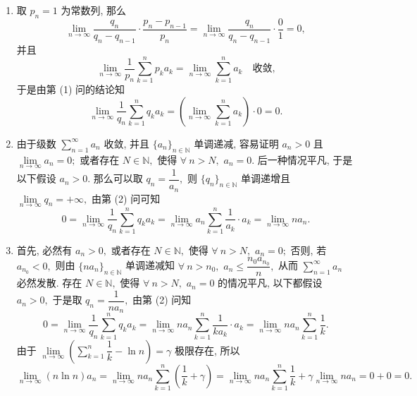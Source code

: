 \begin{solution}
\begin{enumerate}
\item 取 $p_n = 1$ 为常数列, 那么
$$\lim\limits_{n\to\infty} \dfrac{q_n}{q_n - q_{n-1}} \cdot \dfrac{p_n - p_{n-1}}{p_n} = \lim\limits_{n\to\infty} \dfrac{q_n}{q_n - q_{n-1}} \cdot \dfrac{0}{1} = 0,$$
并且
$$\lim\limits_{n \to \infty} \dfrac{1}{p_n} \sum\limits_{k=1}^n p_ka_k = \lim\limits_{n \to \infty} \sum\limits_{k=1}^n a_k \quad \text{收敛,}$$
于是由第 (1) 问的结论知
\begin{equation*}
\lim\limits_{n \to \infty} \dfrac{1}{q_n} \sum\limits_{k=1}^n q_ka_k = \left( \lim\limits_{n \to \infty} \sum\limits_{k=1}^n a_k \right) \cdot 0 = 0.
\end{equation*}

\item 由于级数 $\sum\limits_{n=1}^\infty a_n$ 收敛, 并且 $\{ a_n \}_{n \in \mathbb{N}}$ 单调递减, 容易证明 $a_n > 0$ 且 $\lim\limits_{n\to\infty} a_n = 0;$ 或者存在 $N \in \mathbb{N},$ 使得 $\forall ~ n > N,$ $a_n = 0.$ 后一种情况平凡, 于是以下假设 $a_n > 0.$ 那么可以取 $q_n = \dfrac{1}{a_n},$ 则 $\{ q_n \}_{n \in \mathbb{N}}$ 单调递增且 $\lim\limits_{n \to \infty} q_n = +\infty,$ 由第 (2) 问可知
\begin{equation*}
0 = \lim\limits_{n \to \infty} \dfrac{1}{q_n} \sum\limits_{k=1}^n q_ka_k = \lim\limits_{n \to \infty} a_n \sum\limits_{k=1}^n \dfrac{1}{a_k} \cdot a_k = \lim\limits_{n \to \infty} n a_n.
\end{equation*}

\item 首先, 必然有 $a_n > 0,$ 或者存在 $N \in \mathbb{N},$ 使得 $\forall ~ n > N,$ $a_n = 0;$ 否则, 若 $a_{n_0} < 0,$ 则由 $\{ na_n \}_{n \in \mathbb{N}}$ 单调递减知 $\forall ~ n > n_0,$ $a_n \leqslant \dfrac{n_0 a_{n_0}}{n},$ 从而 $\sum\limits_{n=1}^\infty a_n$ 必然发散. 存在 $N \in \mathbb{N},$ 使得 $\forall ~ n > N,$ $a_n = 0$ 的情况平凡, 以下都假设 $a_n > 0,$ 于是取 $q_n = \dfrac{1}{n a_n},$ 由第 (2) 问知
\begin{equation*}
0 = \lim\limits_{n \to \infty} \dfrac{1}{q_n} \sum\limits_{k=1}^n q_ka_k = \lim\limits_{n \to \infty} n a_n \sum\limits_{k=1}^n \dfrac{1}{k a_k} \cdot a_k = \lim\limits_{n \to \infty} n a_n \sum\limits_{k=1}^n \dfrac{1}{k}.
\end{equation*}
由于 $\lim\limits_{n \to \infty} \left( \sum\limits_{k=1}^n \dfrac{1}{k} - \ln n \right) = \gamma$ 极限存在, 所以
\begin{equation*}
\lim_{n \to \infty} (n\ln n)a_n = \lim_{n \to \infty} n a_n \sum\limits_{k=1}^n \left( \dfrac{1}{k} + \gamma \right) = \lim_{n \to \infty} n a_n \sum\limits_{k=1}^n \dfrac{1}{k} + \gamma \lim_{n \to \infty} n a_n = 0 + 0 = 0.
\end{equation*}
\end{enumerate}
\end{solution}



